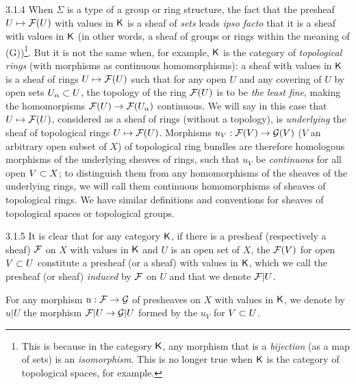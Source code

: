 \documentclass[../main.tex]{subfiles}
\begin{document}
\begin{env}{3.1.4}
When $\Sigma$ is a type of a group or ring structure, the fact that
the presheaf $U\mapsto\mathcal{F}(U)$ with values in $\mathsf{K}$ is a sheaf of \emph{sets} leads \emph{ipso facto}
that it is a sheaf with values in $\mathsf{K}$ (in other words, a sheaf of groups or rings
within the meaning of (G))\footnote{This is because in the category $\mathsf{K}$, any morphism that is a
\emph{bijection} (as a map of sets) is an \emph{isomorphism}. This is no longer true when $\mathsf{K}$
is the category of topological spaces, for example.}. But it is not the same when, for example,
$\mathsf{K}$ is the category of \emph{topological rings} (with morphisms as continuous homomorphisms): a sheaf
with values in $\mathsf{K}$ is a sheaf of rings $U\mapsto\mathcal{F}(U)$ such that for any open $U$
and any covering of $U$ by open sets $U_\alpha\subset U$, the topology of the ring $\mathcal{F}(U)$
is to be \emph{the least fine}, making the homomorpisms $\mathcal{F}(U)\to\mathcal{F}(U_\alpha)$ continuous. We will say in
this case that $U\mapsto\mathcal{F}(U)$, considered as a sheaf of rings (without a topology), is
\emph{underlying} the sheaf of topological rings $U\mapsto\mathcal{F}(U)$. Morphisms $u_V:\mathcal{F}(V)\to\mathcal{G}(V)$
($V$ an arbitrary open subset of $X$) of topological ring bundles are therefore homologous
morphisms of the underlying sheaves of rings, such that $u_V$ be \emph{continuous} for all
open $V\subset X$; to distinguish them from any homomorphisms of the sheaves
of the underlying rings, we will call them continuous homomorphisms of sheaves of topological rings.
We have similar definitions and conventions for sheaves of topological spaces
or topological groups.
\end{env}

\begin{env}{3.1.5}
It is clear that for any category $\mathsf{K}$, if there is a presheaf (respectively a
sheaf) $\mathcal{F}$ on $X$ with values in $\mathsf{K}$ and $U$ is an open set of $X$, the $\mathcal{F}(V)$ for
open $V\subset U$ constitute a presheaf (or a sheaf) with values in $\mathsf{K}$, which we call
the presheaf (or sheaf) \emph{induced} by $\mathcal{F}$ on $U$ and that we denote $\mathcal{F}|U$.

For any morphism $u:\mathcal{F}\to\mathcal{G}$ of presheaves on $X$ with values in $\mathsf{K}$, we
denote by $u|U$ the morphism $\mathcal{F}|U\to\mathcal{G}|U$ formed by the $u_V$ for $V\subset U$.
\end{env}
\end{document}

